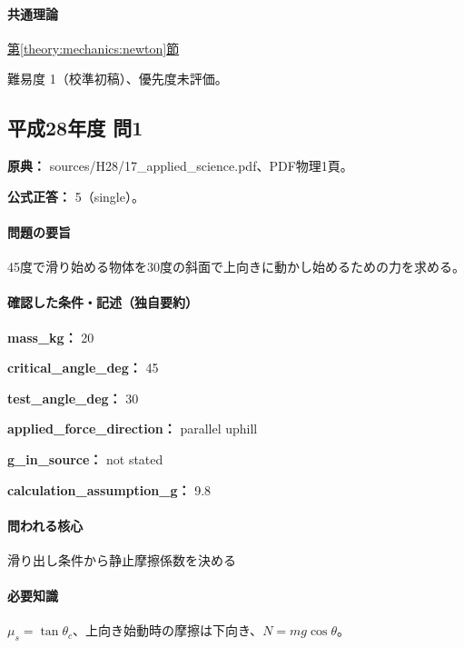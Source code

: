 \paragraph{共通理論} \hyperref[theory:mechanics:newton]{第\ref*{theory:mechanics:newton}節}

\par 難易度 1（校準初稿）、優先度未評価。

\subsection{平成28年度 問1}
\label{q:h28-reg-applied-01}

\noindent\textbf{原典：} sources/H28/17\_applied\_science.pdf、PDF物理1頁。

\textbf{公式正答：} 5（single）。

\paragraph{問題の要旨} 45度で滑り始める物体を30度の斜面で上向きに動かし始めるための力を求める。

\paragraph{確認した条件・記述（独自要約）}\mbox{}\par

\noindent\textbf{mass\_kg：} 20\par

\noindent\textbf{critical\_angle\_deg：} 45\par

\noindent\textbf{test\_angle\_deg：} 30\par

\noindent\textbf{applied\_force\_direction：} parallel uphill\par

\noindent\textbf{g\_in\_source：} not stated\par

\noindent\textbf{calculation\_assumption\_g：} 9.8\par

\paragraph{問われる核心} 滑り出し条件から静止摩擦係数を決める

\paragraph{必要知識} \(\mu_s=\tan\theta_c\)、上向き始動時の摩擦は下向き、\(N=mg\cos\theta\)。

